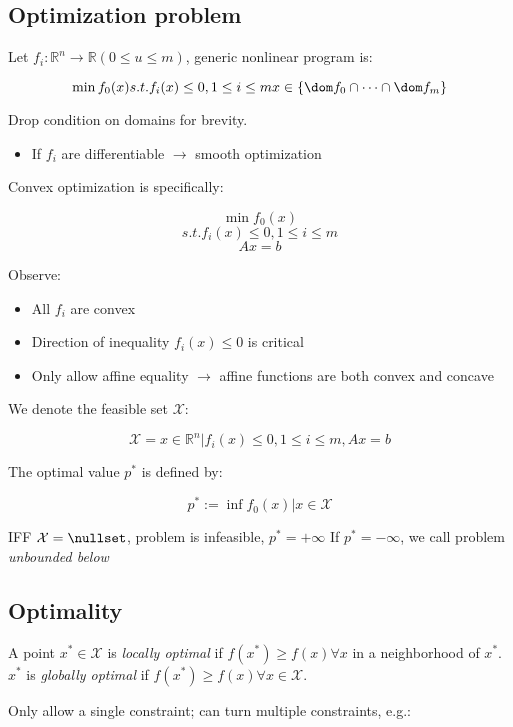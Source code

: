 \documentclass[10pt]{article}
\begin{document}
\subsection{Optimization problem}

Let $f_i: \mathbb{R}^n \rightarrow \mathbb{R} (0 \le u \le m)$, generic nonlinear program is:

$$
\min f_0(x)
s.t. f_i(x) \le 0, 1 \le i \le m
x \in \{\dom f_0 \cap \dots \cap \dom f_m \}
$$

Drop condition on domains for brevity.

\begin{itemize}
\item If $f_i$ are differentiable $\rightarrow$ smooth optimization
\end{itemize}

Convex optimization is specifically:

$$
\min f_0(x)
$$
$$
s.t. f_i(x) \le 0, 1 \le i \le m
$$
$$
Ax = b
$$

Observe:

\begin{itemize}
\item All $f_i$ are convex
\item Direction of inequality $f_i(x) \le 0$ is critical
\item Only allow affine equality $\rightarrow$ affine functions are both convex and concave
\end{itemize}

We denote the feasible set $\mathcal{X}$:

$$
\mathcal{X} = {x \in \mathbb{R}^n | f_i(x) \le 0, 1 \le i \le m, Ax = b}
$$

The optimal value $p^*$ is defined by:

$$
p^* := \inf { f_0(x) | x \in \mathcal{X} }
$$

IFF $\mathcal{X} = \nullset$, problem is infeasible, $p^* = +\infty$
If $p^* = -\infty$, we call problem \emph{unbounded below}

\subsection{Optimality}

A point $x^* \in \mathcal{X}$ is \emph{locally optimal} if $f(x^*) \ge f(x) \forall x$ in a neighborhood of
$x^*$. $x^*$ is \emph{globally optimal} if $f(x^*) \ge f(x) \forall x \in \mathcal{X}$.

Only allow a single constraint; can turn multiple constraints, e.g.:
\end{document}

